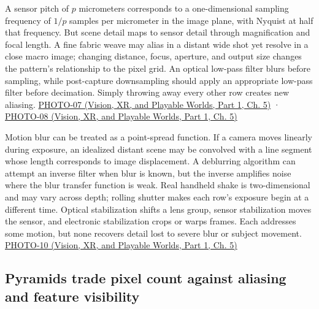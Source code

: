 A sensor pitch of \(p\) micrometers corresponds to a one-dimensional sampling frequency of \(1/p\) samples per micrometer in the image plane, with Nyquist at half that frequency. But scene detail maps to sensor detail through magnification and focal length. A fine fabric weave may alias in a distant wide shot yet resolve in a close macro image; changing distance, focus, aperture, and output size changes the pattern's relationship to the pixel grid. An optical low-pass filter blurs before sampling, while post-capture downsampling should apply an appropriate low-pass filter before decimation. Simply throwing away every other row creates new aliasing. \href{../07-Vision-XR-and-Playable-Worlds-P01/main.pdf\#nameddest=04-visual-computing-ii-ch036-photo-07---photography-session-07}{PHOTO-07 (Vision, XR, and Playable Worlds, Part 1, Ch. 5)} · \href{../07-Vision-XR-and-Playable-Worlds-P01/main.pdf\#nameddest=04-visual-computing-ii-ch036-photo-08---photography-session-08}{PHOTO-08 (Vision, XR, and Playable Worlds, Part 1, Ch. 5)}

Motion blur can be treated as a point-spread function. If a camera moves linearly during exposure, an idealized distant scene may be convolved with a line segment whose length corresponds to image displacement. A deblurring algorithm can attempt an inverse filter when blur is known, but the inverse amplifies noise where the blur transfer function is weak. Real handheld shake is two-dimensional and may vary across depth; rolling shutter makes each row's exposure begin at a different time. Optical stabilization shifts a lens group, sensor stabilization moves the sensor, and electronic stabilization crops or warps frames. Each addresses some motion, but none recovers detail lost to severe blur or subject movement. \href{../07-Vision-XR-and-Playable-Worlds-P01/main.pdf\#nameddest=04-visual-computing-ii-ch036-photo-10---photography-session-10}{PHOTO-10 (Vision, XR, and Playable Worlds, Part 1, Ch. 5)}

\subsection{Pyramids trade pixel count against aliasing and feature visibility}\label{03-visual-computing-i-ch004-pyramids-trade-pixel-count-against-aliasing-and-feature-visibility}

\hypertarget{03-visual-computing-i-ch004-pyramids-trade-pixel-count-against-aliasing-and-feature-visibility}{}

